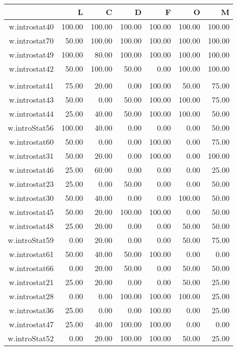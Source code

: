 \documentclass[12pt,english,nohyper]{tufte-handout}\usepackage[]{graphicx}\usepackage[]{color}
\begin{document}
\begin{longtable}{rrrrrrr}
  \hline
 & L & C & D & F & O & M \\ 
  \hline
w.introstat40 & 100.00 & 100.00 & 100.00 & 100.00 & 100.00 & 100.00 \\ 
  w.introstat70 & 50.00 & 100.00 & 100.00 & 100.00 & 100.00 & 100.00 \\ 
  w.introstat49 & 100.00 & 80.00 & 100.00 & 100.00 & 100.00 & 100.00 \\ 
  w.introstat42 & 50.00 & 100.00 & 50.00 & 0.00 & 100.00 & 100.00 \\ 
   &  &  &  &  &  &  \\ 
  w.introstat41 & 75.00 & 20.00 & 0.00 & 100.00 & 50.00 & 75.00 \\ 
  w.introstat43 & 50.00 & 0.00 & 50.00 & 100.00 & 100.00 & 75.00 \\ 
  w.introstat44 & 25.00 & 40.00 & 50.00 & 100.00 & 100.00 & 50.00 \\ 
  w.introStat56 & 100.00 & 40.00 & 0.00 & 0.00 & 0.00 & 50.00 \\ 
  w.introstat60 & 50.00 & 0.00 & 0.00 & 100.00 & 0.00 & 75.00 \\ 
  w.introstat31 & 50.00 & 20.00 & 0.00 & 100.00 & 0.00 & 100.00 \\ 
  w.introstat46 & 25.00 & 60.00 & 0.00 & 0.00 & 0.00 & 25.00 \\ 
  w.introstat23 & 25.00 & 0.00 & 50.00 & 0.00 & 0.00 & 50.00 \\ 
  w.introstat30 & 50.00 & 40.00 & 0.00 & 0.00 & 100.00 & 50.00 \\ 
  w.introstat45 & 50.00 & 20.00 & 100.00 & 100.00 & 0.00 & 50.00 \\ 
  w.introstat48 & 25.00 & 20.00 & 0.00 & 0.00 & 50.00 & 50.00 \\ 
  w.introStat59 & 0.00 & 20.00 & 0.00 & 0.00 & 50.00 & 75.00 \\ 
  w.introstat61 & 50.00 & 40.00 & 50.00 & 100.00 & 0.00 & 0.00 \\ 
  w.introstat66 & 0.00 & 20.00 & 50.00 & 0.00 & 50.00 & 50.00 \\ 
  w.introstat21 & 25.00 & 20.00 & 0.00 & 0.00 & 50.00 & 25.00 \\ 
  w.introstat28 & 0.00 & 0.00 & 100.00 & 100.00 & 100.00 & 25.00 \\ 
  w.introstat36 & 25.00 & 0.00 & 0.00 & 100.00 & 0.00 & 25.00 \\ 
  w.introstat47 & 25.00 & 40.00 & 100.00 & 100.00 & 0.00 & 0.00 \\ 
  w.introStat52 & 0.00 & 20.00 & 100.00 & 100.00 & 50.00 & 25.00 \\ 

\end{longtable}
\end{document}
